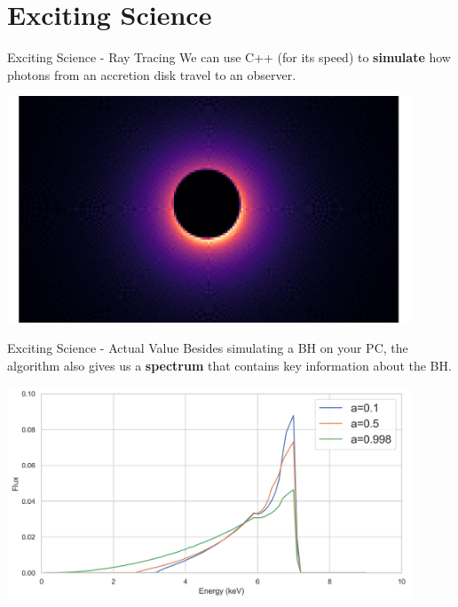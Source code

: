 \documentclass{beamer}
\begin{document}
\section{Exciting Science}


\begin{frame}{Exciting Science - Ray Tracing}
    We can use C++ (for its speed) to \textbf{simulate} how photons from an accretion disk travel to an observer.

    \vspace{0.5cm}

    \centering
    \includegraphics[width=0.90\textwidth]{asset/bh_alt.png}

\end{frame}


\begin{frame}{Exciting Science - Actual Value}
    Besides simulating a BH on your PC, the algorithm also gives us a \textbf{spectrum} that contains key information about the BH.

    \vspace{0.5cm}

    \centering
    \includegraphics[width=0.90\textwidth]{asset/spectrum.png}
\end{frame}
\end{document}
